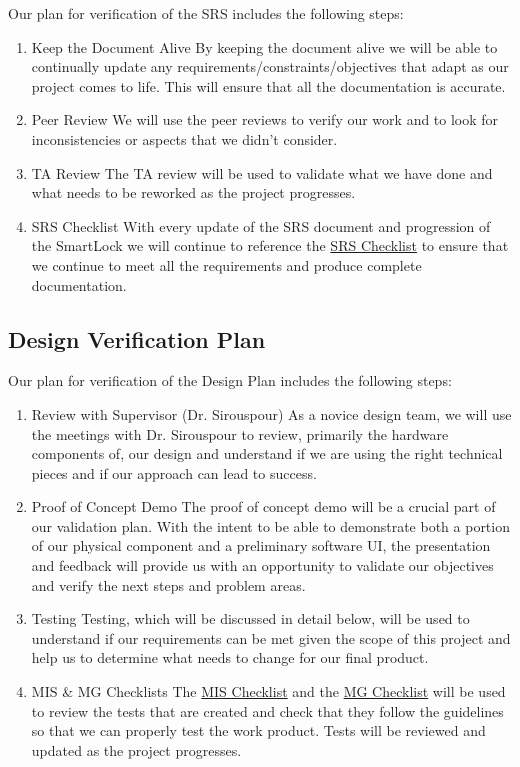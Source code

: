 \documentclass[12pt, titlepage]{article}
\begin{document}
Our plan for verification of the SRS includes the following steps:
\begin{enumerate}
\item Keep the Document Alive
\subitem By keeping the document alive we will be able to continually update any requirements/constraints/objectives that adapt as our project comes to life.  This will ensure that all the documentation is accurate. 
\item Peer Review
\subitem We will use the peer reviews to verify our work and to look for inconsistencies or aspects that we didn't consider.
\item TA Review
\subitem The TA review will be used to validate what we have done and what needs to be reworked as the project progresses.
\item SRS Checklist
\subitem With every update of the SRS document and progression of the SmartLock we will continue to reference the  \href{https://github.com/NevoAbigail/Capstone/blob/main/docs/Checklists/SRS-Checklist.pdf}{SRS Checklist} to ensure that we continue to meet all the requirements and produce complete documentation.
\end{enumerate}

\subsection{Design Verification Plan}

Our plan for verification of the Design Plan includes the following steps:
\begin{enumerate}
\item Review with Supervisor (Dr. Sirouspour)
\subitem As a novice design team, we will use the meetings with Dr. Sirouspour to review, primarily the hardware components of, our design and understand if we are using the right technical pieces and if our approach can lead to success. 
\item Proof of Concept Demo
\subitem The proof of concept demo will be a crucial part of our validation plan.  With the intent to be able to demonstrate both a portion of our physical component and a preliminary software UI, the presentation and feedback will provide us with an opportunity to validate our objectives and verify the next steps and problem areas.
\item Testing
\subitem Testing, which will be discussed in detail below, will be used to understand if our requirements can be met given the scope of this project and help us to determine what needs to change for our final product.
\item MIS \& MG Checklists
\subitem The \href{https://github.com/NevoAbigail/Capstone/blob/main/docs/Checklists/MIS-Checklist.pdf}{MIS Checklist} and the
 \href{https://github.com/NevoAbigail/Capstone/blob/main/docs/Checklists/MG-Checklist.pdf}{MG Checklist} will be used to review the tests that are created and check that they follow the guidelines so that we can properly test the work product. Tests will be reviewed and updated as the project progresses.
\end{enumerate}
\end{document}
